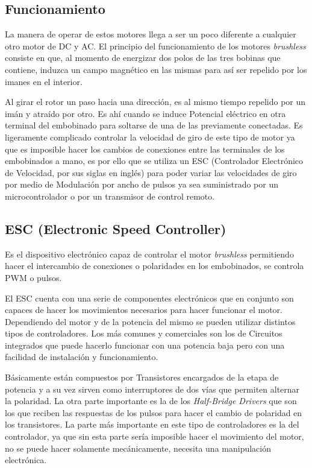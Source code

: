 \documentclass[../main]{subfiles}
\begin{document}
\subsection{Funcionamiento}
La manera de operar de estos motores llega a ser un poco diferente a cualquier otro motor de DC y AC. El principio del funcionamiento de los motores \emph{brushless} consiste en que, al momento de energizar dos polos de las tres bobinas que contiene, induzca un campo magn\'etico{} en las mismas para as\'i{} ser repelido por los imanes en el interior.

Al girar el rotor un paso hacia una direcci\'on{}, es al mismo tiempo repelido por un im\'an{} y atra\'ido{} por otro. Es ah\'i{} cuando se induce Potencial el\'ectrico{} en otra terminal del embobinado para soltarse de una de las previamente conectadas. Es ligeramente complicado controlar la velocidad de giro de este tipo de motor ya que es imposible hacer los cambios de conexiones entre las terminales de los embobinados a mano, es por ello que se utiliza un ESC (Controlador Electr\'onico{} de Velocidad, por sus siglas en ingl\'es{}) para poder variar las velocidades de giro por medio de Modulaci\'on{} por ancho de pulsos ya sea suministrado por un microcontrolador o por un transmisor de control remoto.

\subsection{ESC (Electronic Speed Controller)}
Es el dispositivo electr\'onico{} capaz de controlar el motor \emph{brushless} permitiendo hacer el intercambio de conexiones o polaridades en los embobinados, se controla PWM o pulsos.

El ESC cuenta con una serie de componentes electr\'onicos{} que en conjunto son capaces de hacer los movimientos necesarios para hacer funcionar el motor. Dependiendo del motor y de la potencia del mismo se pueden utilizar distintos tipos de controladores. Los m\'as{} comunes y comerciales son los de Circuitos integrados que puede hacerlo funcionar con una potencia baja pero con una facilidad de instalaci\'on{} y funcionamiento.

B\'asicamente{} est\'an{} compuestos por Transistores encargados de la etapa de potencia y a su vez sirven como interruptores de dos v\'ias{} que permiten alternar la polaridad. La otra parte importante es la de los \emph{Half-Bridge Drivers} que son los que reciben las respuestas de los pulsos para hacer el cambio de polaridad en los transistores. La parte m\'as{} importante en este tipo de controladores es la del controlador, ya que sin esta parte ser\'ia{} imposible hacer el movimiento del motor, no se puede hacer solamente mec\'anicamente{}, necesita una manipulaci\'on{} electr\'onica{}.
\end{document}
